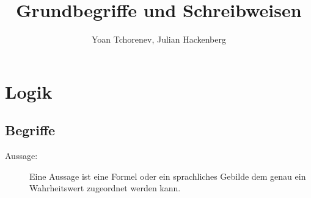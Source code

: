 \documentclass[12pt,a4paper]{article}
\title{Grundbegriffe und Schreibweisen}
\author{Yoan Tchorenev, Julian Hackenberg}
\begin{document}
\begin{titlepage}
	\maketitle
	\tableofcontents
\end{titlepage}

\section{Logik}
\subsection{Begriffe}
\begin{description}
	\item[Aussage:] Eine Aussage ist eine Formel oder ein sprachliches Gebilde dem genau ein Wahrheitswert zugeordnet werden kann.


\end{description}
\end{document}
